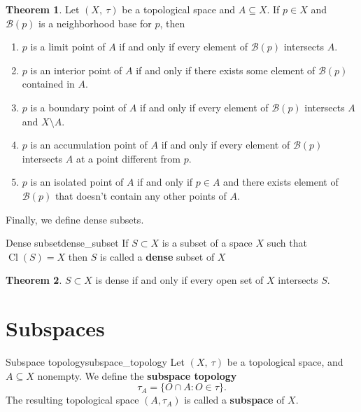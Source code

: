 \documentclass[a4paper]{book}
\theoremstyle{definition}
\newtheorem{theorem}{Theorem}[section]
\theoremstyle{ejemplo}
\theoremstyle{demostracion}
\DeclareMathOperator{\closure}{Cl}
\begin{document}
\begin{theorem}
	Let $(X,\ \tau)$ be a topological space and $A \subseteq X$. If $p \in X$ and $\mathcal{B}(p)$ is a neighborhood base for $p$, then
	\begin{enumerate}
		\item
		$p$ is a limit point of $A$ if and only if every element of $\mathcal{B}(p)$ intersects $A$.
		
		\item
		$p$ is an interior point of $A$ if and only if there exists some element of $\mathcal{B}(p)$ contained in $A$.
		
		\item
		$p$ is a boundary point of $A$ if and only if every element of $\mathcal{B}(p)$ intersects $A$ and $X \setminus A$.
		
		\item
		$p$ is an accumulation point of $A$ if and only if every element of $\mathcal{B}(p)$ intersects $A$ at a point different from $p$.
		
		\item
		$p$ is an isolated point of $A$ if and only if $p \in A$ and there exists element of $\mathcal{B}(p)$ that doesn't contain any other points of $A$.
	\end{enumerate}
\end{theorem}

Finally, we define dense subsets.
\begin{define}{Dense subset}{dense_subset}
	If $S \subset X$ is a subset of a space $X$ such that $\closure(S) = X$ then $S$ is called a \textbf{dense} subset of $X$
\end{define}

\begin{theorem}
	$S \subset X$ is dense if and only if every open set of $X$ intersects $S$.
\end{theorem}

\section{Subspaces}
\begin{define}{Subspace topology}{subspace_topology}
	Let $(X,\ \tau)$ be a topological space, and $A \subseteq X$ nonempty. We define the \textbf{subspace topology}
	\begin{equation*}
		\tau_A = \{O \cap A : O \in \tau \}.
	\end{equation*}
	The resulting topological space $(A, \tau_A)$ is called a \textbf{subspace} of $X$.
\end{define}
\end{document}
